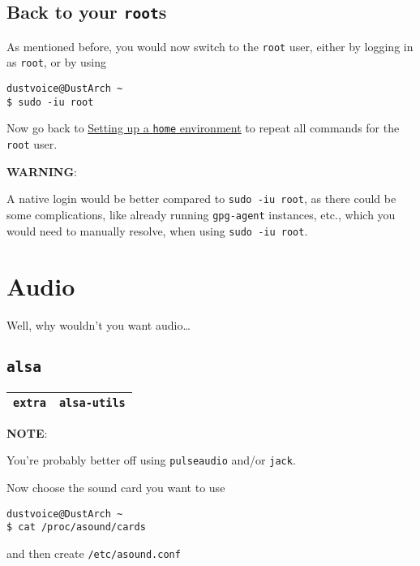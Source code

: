\documentclass[9pt]{report}
\newcommand{\admonition}[2]{\textbf{#1}: {#2}}
\begin{document}
\vfill\eject

\hypertarget{x-back-to-your-roots}{\subsection{Back to your \texttt{root}s}}
As mentioned before, you would now switch to the \texttt{root} user, either by logging in as \texttt{root}, or by using


\begin{verbatim}
dustvoice@DustArch ~
$ sudo -iu root
\end{verbatim}

Now go back to \hyperlink{setup-home}{Setting up a \texttt{home} environment} to repeat all commands for the \texttt{root} user.


\admonition{WARNING}{A native login would be better compared to \texttt{sudo -iu root}, as there could be some complications, like already running \texttt{gpg-agent} instances, etc., which you would need to manually resolve, when using \texttt{sudo -iu root}.

}

\vfill\eject

\hypertarget{x-audio}{\section{Audio}}
Well, why wouldn’t you want audio…​



\vfill\eject

\hypertarget{x-alsa}{\subsection{\texttt{alsa}}}
\begin{center}
\begin{tabular}{|c|c|}
\hline
\texttt{extra} & \texttt{alsa-utils} \\ 
\hline
\end{tabular}
\end{center}

\admonition{NOTE}{You’re probably better off using \texttt{pulseaudio} and/or \texttt{jack}.

}
Now choose the sound card you want to use


\begin{verbatim}
dustvoice@DustArch ~
$ cat /proc/asound/cards
\end{verbatim}

and then create \texttt{/etc/asound.conf}
\end{document}
